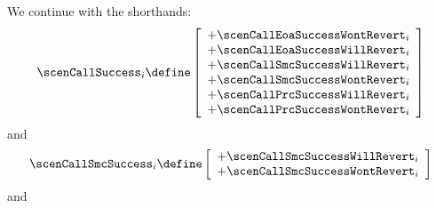 We continue with the shorthands:
\[
	\scenCallSuccess _{i} \define
	 \left[ \begin{array}{l}
		+ \scenCallEoaSuccessWontRevert               _{i}    \\
		+ \scenCallEoaSuccessWillRevert               _{i}    \\
		+ \scenCallSmcSuccessWillRevert        _{i}    \\
		+ \scenCallSmcSuccessWontRevert        _{i}    \\
		+ \scenCallPrcSuccessWillRevert        _{i}    \\
		+ \scenCallPrcSuccessWontRevert        _{i}    \\
	\end{array} \right]
\]
and
\[
	\scenCallSmcSuccess _{i} \define
	 \left[ \begin{array}{l}
		+ \scenCallSmcSuccessWillRevert        _{i}    \\
		+ \scenCallSmcSuccessWontRevert        _{i}    \\
	\end{array} \right]
\]
and
